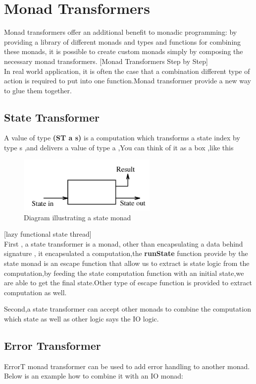 \chapter{Monad Transformers}

Monad transformers offer an additional benefit to monadic programming: by providing a
library of different monads and types and functions for combining these monads, it is possible
to create custom monads simply by composing the necessary monad transformers. [Monad Transformers Step by Step]\\

In real world application, it is often the case that a combination different type of action is required to put into one function.Monad transformer provide a new way to glue them together.

\section{State Transformer}
A value of type \textbf{(ST a s)} is a computation which transforms a state index by type s ,and delivers a value of type a ,You can think of it as a box ,like this 
\begin{figure}[H]
  \centering
	\includegraphics[width=0.60\textwidth]{pic/c3/state.png}
	\caption{Diagram illustrating a state monad}
\end{figure}
[lazy functional state thread]
\\

First , a state transformer is a monad, other than encapsulating a data behind signature , it encapsulated a computation,the \textbf{runState} function provide by the state monad is an escape function that allow us to extract is state logic from the computation,by feeding the state computation function with an initial state,we are able to get the final state.Other type of escape function is provided to extract computation as well.

Second,a state transformer can accept other monads to combine the computation which state as well as other logic says the IO logic.


\section{Error Transformer}
ErrorT monad transformer can be used to add error handling to another monad. Below is an example how to combine it with an IO monad:

